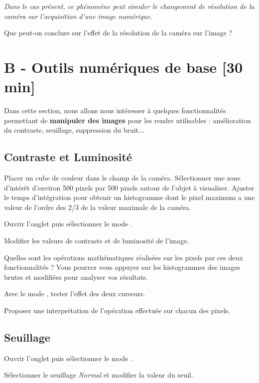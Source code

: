 \textit{Dans le cas présent, ce phénomène peut simuler le changement de résolution de la caméra sur l'acquisition d'une image numérique.}

\Quest Que peut-on conclure sur l'effet de la résolution de la caméra sur l'image ?


\section{B - Outils numériques de base {[30 min]}}

Dans cette section, nous allons nous intéresser à quelques fonctionnalités permettant de \textbf{manipuler des images} pour les rendre utilisables : amélioration du contraste, seuillage, suppression du bruit...

\subsection{Contraste et Luminosité}

\Manip Placer un cube de couleur dans le champ de la caméra. Sélectionner une zone d'intérêt d'environ 500 pixels par 500 pixels autour de l'objet à visualiser. Ajuster le temps d'intégration pour obtenir un histogramme dont le pixel maximum a une valeur de l'ordre des 2/3 de la valeur maximale de la caméra. 

\Manip Ouvrir l'onglet  puis sélectionner le mode .

\Manip Modifier les valeurs de contraste et de luminosité de l'image.

\Quest Quelles sont les opérations mathématiques réalisées sur les pixels par ces deux fonctionnalités ? Vous pourrez vous appuyer sur les histogrammes des images brutes et modifiées pour analyser vos résultats.

\Manip Avec le mode , tester l'effet des deux curseurs.

\Quest Proposer une interprétation de l'opération effectuée sur chacun des pixels.


\subsection{Seuillage}

\Manip Ouvrir l'onglet  puis sélectionner le mode .

\Manip Sélectionner le seuillage \textsl{Normal} et modifier la valeur du seuil.

